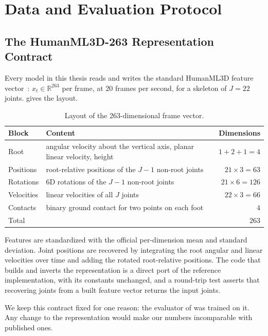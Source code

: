 \chapter{Data and Evaluation Protocol}
\label{chap:protocol}

\section{The HumanML3D-263 Representation Contract}
\label{sec:protocol_representation}

Every model in this thesis reads and writes the standard HumanML3D feature vector~\cite{guo2022humanml3d}: $x_t \in \mathbb{R}^{263}$ per frame, at 20 frames per second, for a skeleton of $J = 22$ joints.  gives the layout.

\begin{table}[H]
\centering
\caption{Layout of the 263-dimensional frame vector.}
\label{tab:layout263}
\begin{tabular}{lp{}r}
\toprule
Block & Content & Dimensions \\
\midrule
Root & angular velocity about the vertical axis, planar linear velocity, height & $1 + 2 + 1 = 4$ \\
Positions & root-relative positions of the $J-1$ non-root joints & $21 \times 3 = 63$ \\
Rotations & 6D rotations of the $J-1$ non-root joints & $21 \times 6 = 126$ \\
Velocities & linear velocities of all $J$ joints & $22 \times 3 = 66$ \\
Contacts & binary ground contact for two points on each foot & $4$ \\
\midrule
Total & & $263$ \\
\bottomrule
\end{tabular}
\end{table}

Features are standardized with the official per-dimension mean and standard deviation. Joint positions are recovered by integrating the root angular and linear velocities over time and adding the rotated root-relative positions. The code that builds and inverts the representation is a direct port of the reference implementation, with its constants unchanged, and a round-trip test asserts that recovering joints from a built feature vector returns the input joints.

We keep this contract fixed for one reason: the evaluator of  was trained on it. Any change to the representation would make our numbers incomparable with published ones.


